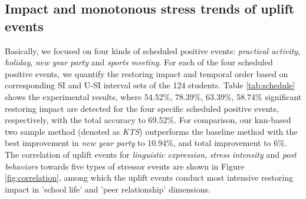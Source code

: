 \subsection{Impact and monotonous stress trends of uplift events}
Basically, we focused on four kinds of scheduled positive events:
\emph{practical activity}, \emph{holiday}, \emph{new year party} and \emph{sports meeting}.
For each of the four scheduled positive events,
we quantify the restoring impact and temporal order
based on corresponding SI and U-SI interval sets of the 124 students.
Table \ref{tab:schedule} shows the experimental results,
where 54.52\%, 78.39\%, 63.39\%, 58.74\% significant restoring impact are detected for the four specific scheduled positive events, respectively, with the total accuracy to 69.52\%.
For comparison,
our knn-based two sample method (denoted as \emph{KTS}) outperforms the baseline method
with the best improvement in \emph{new year party} to 10.94\%,
and total improvement to 6\%.
The correlation of uplift events for \emph{linguistic expression},
\emph{stress intensity} and \emph{post behaviors} towards five types of stressor events
are shown in Figure \ref{fig:correlation},
among which the uplift events conduct most intensive restoring impact in 'school life' and 'peer relationship' dimensions.



